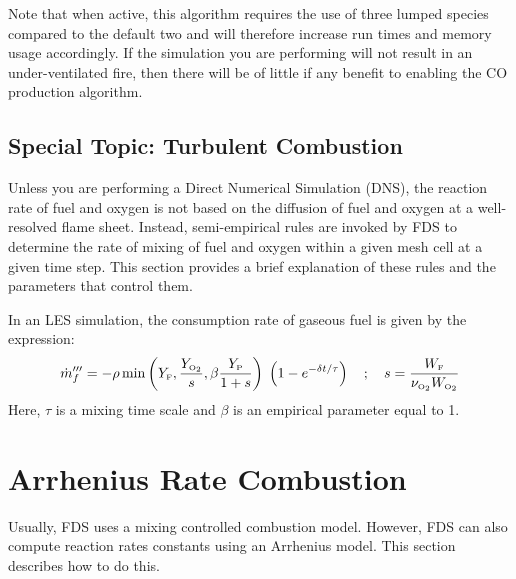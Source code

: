 \documentclass[11pt]{book}
\newcommand{\dt}{\delta t}
\newcommand{\dm}{\dot{m}}
\newcommand{\be}{\begin{equation}}
\newcommand{\ee}{\end{equation}}
\newcommand{\OTWO}{{\tiny \hbox{O}_2}}
\newcommand{\F}{{\tiny \hbox{F}}}
\begin{document}
\begin{warning}
\noindent
Note that when active, this algorithm requires the use of three lumped species compared to the default two and will therefore
increase run times and memory usage accordingly.  If the simulation you are
performing will not result in an under-ventilated fire, then there will be of
little if any benefit to enabling the CO production algorithm.
\end{warning}


\subsection{Special Topic: Turbulent Combustion}

\label{info:turbulent_combustion}

Unless you are performing a Direct Numerical Simulation (DNS), the reaction rate of fuel and oxygen is not based on the diffusion of
fuel and oxygen at a well-resolved flame sheet. Instead, semi-empirical rules are invoked by FDS to determine the rate of mixing of fuel and oxygen within
a given mesh cell at a given time step. This section provides a brief explanation of these rules and the parameters that control them.

In an LES simulation, the consumption rate of gaseous fuel is given by the expression:
\be \dm_f''' = -\rho \min \left( Y_\F , \frac{Y_\OTWO}{s}, \beta \frac{Y_{\hbox{\tiny P}}}{1+s} \right) \; \left( 1 - e^{-\dt/\tau} \right)   \quad ; \quad
   s=\frac{W_\F}{\nu_{\OTWO} W_{\OTWO} }  \ee
Here, $\tau$ is a mixing time scale and $\beta$ is an empirical parameter equal to 1.



\newpage


\section{Arrhenius Rate Combustion}
\label{info:finite}

Usually, FDS uses a mixing controlled combustion model. However, FDS can also compute reaction rates constants using an Arrhenius model. This section describes how to do this.
\end{document}

